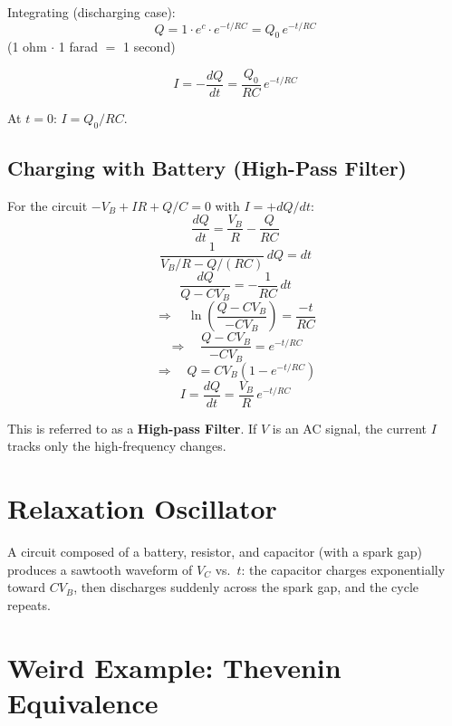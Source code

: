 Integrating (discharging case):
\[
    \boxed{Q = 1\cdot e^{c}\cdot e^{-t/RC} = Q_0\,e^{-t/RC}}
\]
(1 ohm $\cdot$ 1 farad $=$ 1 second)

\[
    I = -\frac{dQ}{dt} = \frac{Q_0}{RC}\,e^{-t/RC}
\]

At $t=0$: $I = Q_0/RC$.

\subsection{Charging with Battery (High-Pass Filter)}

For the circuit $-V_B + IR + Q/C = 0$ with $I = +dQ/dt$:
\[
    \frac{dQ}{dt} = \frac{V_B}{R} - \frac{Q}{RC}
\]
\[
    \frac{1}{V_B/R - Q/(RC)}\,dQ = dt
\]
\[
    \frac{dQ}{Q - CV_B} = -\frac{1}{RC}\,dt
\]
\[
    \Rightarrow\quad \ln\!\left(\frac{Q-CV_B}{-CV_B}\right) = \frac{-t}{RC}
\]
\[
    \Rightarrow\quad \frac{Q - CV_B}{-CV_B} = e^{-t/RC}
\]
\[
    \Rightarrow\quad \boxed{Q = CV_B\!\left(1 - e^{-t/RC}\right)}
\]
\[
    I = \frac{dQ}{dt} = \frac{V_B}{R}\,e^{-t/RC}
\]

This is referred to as a \textbf{High-pass Filter}. If $V$ is an AC signal, the current $I$ tracks only the high-frequency changes.

\section{Relaxation Oscillator}

A circuit composed of a battery, resistor, and capacitor (with a spark gap) produces a sawtooth waveform of $V_C$ vs.\ $t$: the capacitor charges exponentially toward $CV_B$, then discharges suddenly across the spark gap, and the cycle repeats.

\section{Weird Example: Thevenin Equivalence}

